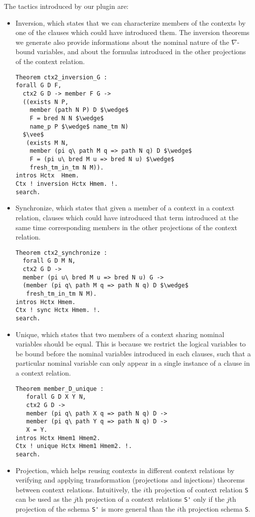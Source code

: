 \documentclass[nocopyrightspace,authoryear]{sigplanconf}
\begin{document}
The tactics introduced by our plugin are:
\begin{itemize}
\item Inversion, which states that we can characterize members of the contexts by one of the clauses which could have introduced them. The inversion theorems we generate also provide informations about the nominal nature of the $\nabla$-bound variables, and about the formulas introduced in the other projections of the context relation.

\begin{lstlisting}
Theorem ctx2_inversion_G :
forall G D F,
  ctx2 G D -> member F G ->
  ((exists N P, 
    member (path N P) D $\wedge$
    F = bred N N $\wedge$  
    name_p P $\wedge$ name_tm N)
  $\vee$
   (exists M N, 
    member (pi q\ path M q => path N q) D $\wedge$ 
    F = (pi u\ bred M u => bred N u) $\wedge$  
    fresh_tm_in_tm N M)).
intros Hctx  Hmem. 
Ctx ! inversion Hctx Hmem. !.
search.
\end{lstlisting}

\item Synchronize, which states that given a member of a context in a context relation, clauses which could have introduced that term introduced at the same time corresponding members in the other projections of the context relation.
\begin{lstlisting}
Theorem ctx2_synchronize :
  forall G D M N,
  ctx2 G D ->
  member (pi u\ bred M u => bred N u) G ->
  (member (pi q\ path M q => path N q) D $\wedge$ 
   fresh_tm_in_tm N M).
intros Hctx Hmem. 
Ctx ! sync Hctx Hmem. !.
search.
\end{lstlisting}

\item Unique, which states that two members of a context sharing nominal variables should be equal. This is because we restrict the logical variables to be bound before the nominal variables introduced in each clauses, such that a particular nominal variable can only appear in a single instance of a clause in a context relation.   

\begin{lstlisting}
Theorem member_D_unique :
   forall G D X Y N,
   ctx2 G D ->
   member (pi q\ path X q => path N q) D ->
   member (pi q\ path Y q => path N q) D ->
   X = Y.
intros Hctx Hmem1 Hmem2. 
Ctx ! unique Hctx Hmem1 Hmem2. !. 
search.
\end{lstlisting}

\item Projection, which helps reusing contexts in different context relations by verifying and applying transformation (projections and injections) theorems between context relations. Intuitively, the $i$th projection of context relation \lstinline|S| can be used as the $j$th projection of a context relations \lstinline|S'| only if the $j$th projection of the schema \lstinline|S'| is more general than the $i$th projection schema \lstinline|S|.


\end{itemize}
\end{document}

